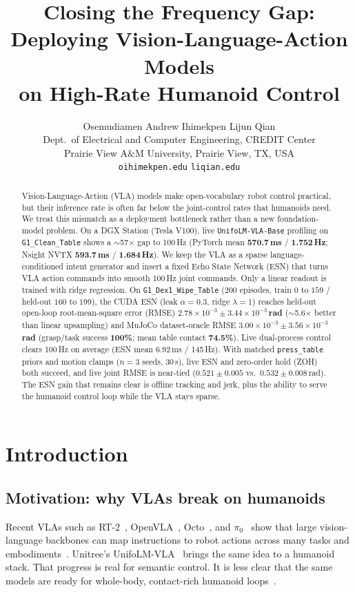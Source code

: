 \documentclass{article}
\title{Closing the Frequency Gap:\\
Deploying Vision-Language-Action Models\\
on High-Rate Humanoid Control}
\author{%
  Osemudiamen Andrew Ihimekpen \And Lijun Qian \\[0.35em]
  {\small Dept.\ of Electrical and Computer Engineering, CREDIT Center}\\
  {\small Prairie View A\&M University, Prairie View, TX, USA}\\
  {\small\texttt{oihimekpen\string@pvamu.edu} \quad \texttt{liqian\string@pvamu.edu}}
}
\begin{document}
\maketitle

\begin{abstract}
Vision-Language-Action (VLA) models make open-vocabulary robot control practical, but their inference rate is often far below the joint-control rates that humanoids need.
We treat this mismatch as a deployment bottleneck rather than a new foundation-model problem.
On a DGX Station (Tesla V100), live \texttt{UnifoLM-VLA-Base} profiling on \texttt{G1\_Clean\_Table} shows a $\sim$57$\times$ gap to 100\,Hz (PyTorch mean \textbf{570.7\,ms} / \textbf{1.752\,Hz}; Nsight NVTX \textbf{593.7\,ms} / \textbf{1.684\,Hz}).
We keep the VLA as a sparse language-conditioned intent generator and insert a fixed Echo State Network (ESN) that turns VLA action commands into smooth 100\,Hz joint commands.
Only a linear readout is trained with ridge regression.
On \texttt{G1\_Dex1\_Wipe\_Table} (200 episodes, train $0$ to $159$ / held-out $160$ to $199$), the CUDA ESN (leak $\alpha{=}0.3$, ridge $\lambda{=}1$) reaches held-out open-loop root-mean-square error (RMSE) \textbf{$2.78\times10^{-3}\!\pm\!3.44\times10^{-3}$\,rad} ($\sim$5.6$\times$ better than linear upsampling) and MuJoCo dataset-oracle RMSE \textbf{$3.00\times10^{-3}\!\pm\!3.56\times10^{-3}$\,rad} (grasp/task success \textbf{100\%}; mean table contact \textbf{74.5\%}).
Live dual-process control clears 100\,Hz on average (ESN mean 6.92\,ms / 145\,Hz).
With matched \texttt{press\_table} priors and motion clamps ($n{=}3$ seeds, 30\,s), live ESN and zero-order hold (ZOH) both succeed, and live joint RMSE is near-tied ($0.521\!\pm\!0.005$ vs.\ $0.532\!\pm\!0.008$\,rad).
The ESN gain that remains clear is offline tracking and jerk, plus the ability to serve the humanoid control loop while the VLA stays sparse.
\end{abstract}

\section{Introduction}
\subsection{Motivation: why VLAs break on humanoids}
Recent VLAs such as RT-2~\cite{RT22023}, OpenVLA~\cite{OpenVLA2025}, Octo~\cite{Octo2024}, and $\pi_0$~\cite{PiZero2024} show that large vision-language backbones can map instructions to robot actions across many tasks and embodiments~\cite{OpenXEmbodiment2024,MaVLASurvey2024}.
Unitree's UnifoLM-VLA~\cite{UnifoLM2026} brings the same idea to a humanoid stack.
That progress is real for semantic control.
It is less clear that the same models are ready for whole-body, contact-rich humanoid loops~\cite{PhysicalAI2025,GR00T2025}.
\end{document}
